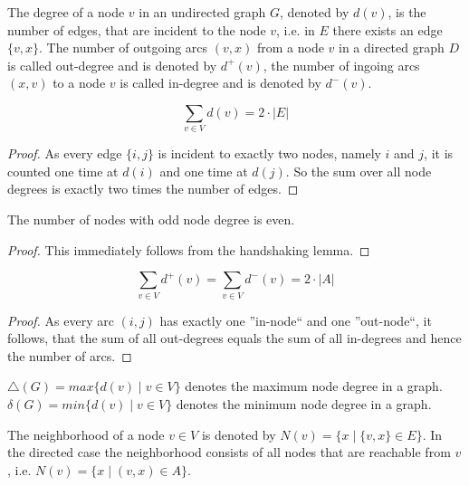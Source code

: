 \begin{definition}
The degree of a node $v$ in an undirected graph $G$, denoted by $d(v)$, is the number of edges, that are incident to the node $v$, i.e. in $E$ there exists an edge $\{v, x\}$. The number of outgoing arcs $(v, x)$ from a node $v$ in a directed graph $D$ is called out-degree and is denoted by $d^+(v)$, the number of ingoing arcs $(x, v)$ to a node $v$ is called in-degree and is denoted by $d^-(v)$.
\end{definition}

\begin{lemma}
$$\sum_{v \in V}d(v) = 2\cdot\left\vert{E}\right\vert$$
\end{lemma}

\begin{proof}
As every edge $\{i, j\}$ is incident to exactly two nodes, namely $i$ and $j$, it is
counted one time at $d(i)$ and one time at $d(j)$. So the sum over all node degrees
is exactly two times the number of edges.
\end{proof}

\begin{corollary}
The number of nodes with odd node degree is even.
\end{corollary}

\begin{proof}
This immediately follows from the handshaking lemma.
\end{proof}

\begin{lemma}
$$\sum_{v\in V}d^+(v)=\sum_{v\in V}d^-(v)=2\cdot\left\vert{A}\right\vert$$
\end{lemma}

\begin{proof}
As every arc $(i, j)$ has exactly one ”in-node“ and one ”out-node“, it follows,
that the sum of all out-degrees equals the sum of all in-degrees and hence the
number of arcs.
\end{proof}

\begin{definition}
$\triangle (G) = max\{d(v) \mid v \in V \}$ denotes the maximum node degree in a graph. $\delta (G) = min\{d(v) \mid v \in V \}$ denotes the minimum node degree in a graph.
\end{definition}

\begin{definition}
The neighborhood of a node $v \in V$ is denoted by $N(v) = \{x \mid \{v, x\} \in E\}$. In the directed case the neighborhood consists of all nodes that are reachable from $v$, i.e. $N(v) = \{x \mid (v, x) \in A\}$.
\end{definition}

